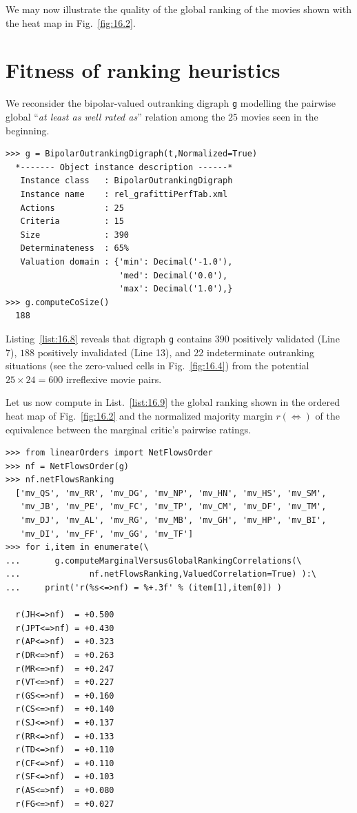 We may now illustrate the quality of the global ranking of the movies shown with the heat map in Fig.~\vref{fig:16.2}. 

\section{Fitness of ranking heuristics}
\label{sec:16.3}

We reconsider the bipolar-valued outranking digraph \texttt{g} modelling the pairwise global ``\emph{at least as well rated as}'' relation among the $25$ movies seen in the beginning.

\begin{lstlisting}[caption={Global movies outranking digraph},label=list:16.8]
>>> g = BipolarOutrankingDigraph(t,Normalized=True)
  *------- Object instance description ------*
   Instance class   : BipolarOutrankingDigraph
   Instance name    : rel_grafittiPerfTab.xml
   Actions          : 25
   Criteria         : 15
   Size             : 390
   Determinateness  : 65%
   Valuation domain : {'min': Decimal('-1.0'),
                       'med': Decimal('0.0'),
                       'max': Decimal('1.0'),}
>>> g.computeCoSize()
  188
\end{lstlisting}
Listing~\vref{list:16.8} reveals that digraph \texttt{g} contains $390$ positively validated (Line 7), $188$ positively invalidated (Line 13), and 22 indeterminate outranking situations (see the zero-valued cells in Fig.~\vref{fig:16.4}) from the potential $25 \times 24 = 600$ irreflexive movie pairs.

Let us now compute in List.~\vref{list:16.9} the global \NetFlows ranking shown in the ordered heat map of Fig.~\vref{fig:16.2} and the normalized majority margin $r(\Leftrightarrow)$  of the equivalence between the marginal critic's pairwise ratings.
\begin{lstlisting}[caption={Computing marginal criterion correlations with global \NetFlows ranking},label=list:16.9]
>>> from linearOrders import NetFlowsOrder
>>> nf = NetFlowsOrder(g)
>>> nf.netFlowsRanking
  ['mv_QS', 'mv_RR', 'mv_DG', 'mv_NP', 'mv_HN', 'mv_HS', 'mv_SM',
   'mv_JB', 'mv_PE', 'mv_FC', 'mv_TP', 'mv_CM', 'mv_DF', 'mv_TM',
   'mv_DJ', 'mv_AL', 'mv_RG', 'mv_MB', 'mv_GH', 'mv_HP', 'mv_BI',
   'mv_DI', 'mv_FF', 'mv_GG', 'mv_TF']
>>> for i,item in enumerate(\
...       g.computeMarginalVersusGlobalRankingCorrelations(\
...              nf.netFlowsRanking,ValuedCorrelation=True) ):\
...     print('r(%s<=>nf) = %+.3f' % (item[1],item[0]) )   

  r(JH<=>nf)  = +0.500
  r(JPT<=>nf) = +0.430
  r(AP<=>nf)  = +0.323
  r(DR<=>nf)  = +0.263
  r(MR<=>nf)  = +0.247
  r(VT<=>nf)  = +0.227
  r(GS<=>nf)  = +0.160
  r(CS<=>nf)  = +0.140
  r(SJ<=>nf)  = +0.137
  r(RR<=>nf)  = +0.133
  r(TD<=>nf)  = +0.110
  r(CF<=>nf)  = +0.110
  r(SF<=>nf)  = +0.103
  r(AS<=>nf)  = +0.080
  r(FG<=>nf)  = +0.027
\end{lstlisting}

